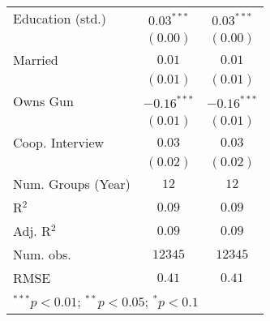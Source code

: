 \begin{table}
\begin{center}
\begin{tabular}{l c c}
Education (std.)        & $0.03^{***}$  & $0.03^{***}$  \\
                        & $(0.00)$      & $(0.00)$      \\
Married                 & $0.01$        & $0.01$        \\
                        & $(0.01)$      & $(0.01)$      \\
Owns Gun                & $-0.16^{***}$ & $-0.16^{***}$ \\
                        & $(0.01)$      & $(0.01)$      \\
Coop. Interview         & $0.03$        & $0.03$        \\
                        & $(0.02)$      & $(0.02)$      \\
\midrule
Num. Groups (Year)      & $12$          & $12$          \\
R$^2$                   & $0.09$        & $0.09$        \\
Adj. R$^2$              & $0.09$        & $0.09$        \\
Num. obs.               & $12345$       & $12345$       \\
RMSE                    & $0.41$        & $0.41$        \\
\bottomrule
\multicolumn{3}{l}{\scriptsize{$^{***}p<0.01$; $^{**}p<0.05$; $^{*}p<0.1$}}
\end{tabular}
\label{table_ate_alt_treat}
\end{center}
\end{table}
